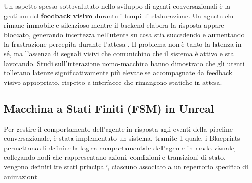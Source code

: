 Un aspetto spesso sottovalutato nello sviluppo di agenti conversazionali è la gestione del \textbf{feedback visivo} durante i tempi di elaborazione. Un agente che rimane immobile e silenzioso mentre il backend elabora la risposta appare bloccato, generando incertezza nell'utente su cosa stia succedendo e aumentando la frustrazione percepita durante l'attesa \cite{latency_eca}. Il problema non è tanto la latenza in sé, ma l'assenza di segnali visivi che comunichino che il sistema è attivo e sta lavorando. Studi sull'interazione uomo-macchina hanno dimostrato che gli utenti tollerano latenze significativamente più elevate se accompagnate da feedback visivo appropriato, rispetto a interfacce che rimangono statiche in attesa.

\newpage

\subsection{Macchina a Stati Finiti (FSM) in Unreal}

Per gestire il comportamento dell'agente in risposta agli eventi della pipeline conversazionale, è stata implementato un sistema, tramite il quale, i Blueprints permettono di definire la logica comportamentale dell'agente in modo visuale, collegando nodi che rappresentano azioni, condizioni e transizioni di stato. vengono definiti tre stati principali, ciascuno associato a un repertorio specifico di animazioni:

